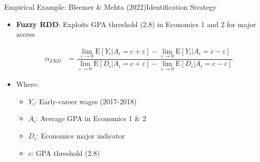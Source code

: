\documentclass[dvipsnames,hyperref={pdfpagelabels=false}]{beamer}
\begin{document}
\begin{frame}{Empirical Example: Bleemer \& Mehta (2022)}{Identification Strategy}
	\begin{itemize}
		\item \textbf{Fuzzy RDD}: Exploits GPA threshold (2.8) in Economics 1 and 2 for major access
		
		\vspace{0.2cm}
		\begin{equation*}
			\begin{aligned}
				\alpha_{FRD} &=\dfrac{\lim_{\varepsilon\rightarrow 0}\mathrm{E}[Y_{i}|A_{i}=c+\varepsilon]-\lim_{\varepsilon\rightarrow 0}\mathrm{E}[Y_{i}|A_{i}=c-\varepsilon]}{\lim_{\varepsilon\rightarrow 0}\mathrm{E}[D_{i}|A_{i}=c+\varepsilon]-\lim_{\varepsilon\rightarrow 0}\mathrm{E}[D_{i}|A_{i}=c-\varepsilon]} 
			\end{aligned}
		\end{equation*} 
		
		\item Where:
		\begin{itemize}
					\vspace{0.2cm}
			\item $Y_i$: Early-career wages (2017-2018)
					\vspace{0.2cm}
			\item $A_i$: Average GPA in Economics 1 \& 2
					\vspace{0.2cm}
			\item $D_i$: Economics major indicator
					\vspace{0.2cm}
			\item $c$: GPA threshold (2.8)
		\end{itemize}
	\end{itemize}
\end{frame}
\end{document}
